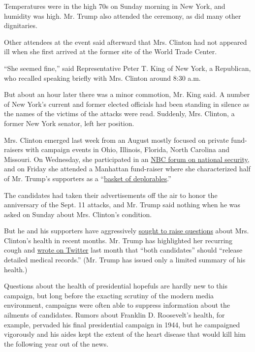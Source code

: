 Temperatures were in the high 70s on Sunday morning in New York, and
humidity was high. Mr. Trump also attended the ceremony, as did many
other dignitaries.

Other attendees at the event said afterward that Mrs. Clinton had not
appeared ill when she first arrived at the former site of the World
Trade Center.

``She seemed fine,'' said Representative Peter T. King of New York, a
Republican, who recalled speaking briefly with Mrs. Clinton around 8:30
a.m.

But about an hour later there was a minor commotion, Mr. King said. A
number of New York's current and former elected officials had been
standing in silence as the names of the victims of the attacks were
read. Suddenly, Mrs. Clinton, a former New York senator, left her
position.

Mrs. Clinton emerged last week from an August mostly focused on private
fund-raisers with campaign events in Ohio, Illinois, Florida, North
Carolina and Missouri. On Wednesday, she participated in an
\href{https://www.nytimes3xbfgragh.onion/2016/09/08/us/politics/hillary-clinton-donald-trump-national-security.html}{NBC
forum on national security}, and on Friday she attended a Manhattan
fund-raiser where she characterized half of Mr. Trump's supporters as a
``\href{http://www.nytimes3xbfgragh.onion/2016/09/11/us/politics/hillary-clinton-basket-of-deplorables.html}{basket
of deplorables}.''

The candidates had taken their advertisements off the air to honor the
anniversary of the Sept. 11 attacks, and Mr. Trump said nothing when he
was asked on Sunday about Mrs. Clinton's condition.

But he and his supporters have aggressively
\href{http://www.nytimes3xbfgragh.onion/2016/09/08/upshot/release-your-medical-records-first-you-must-collect-them.html}{sought
to raise questions} about Mrs. Clinton's health in recent months. Mr.
Trump has highlighted her recurring cough and
\href{https://twitter.com/realdonaldtrump/status/770039317142069248}{wrote
on Twitter} last month that ``both candidates'' should ``release
detailed medical records.'' (Mr. Trump has issued only a limited summary
of his health.)

Questions about the health of presidential hopefuls are hardly new to
this campaign, but long before the exacting scrutiny of the modern media
environment, campaigns were often able to suppress information about the
ailments of candidates. Rumors about Franklin D. Roosevelt's health, for
example, pervaded his final presidential campaign in 1944, but he
campaigned vigorously and his aides kept the extent of the heart disease
that would kill him the following year out of the news.

